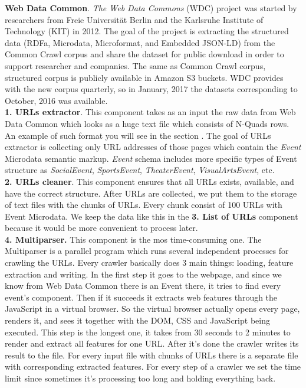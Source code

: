 \textbf{Web Data Common}. \textit{The Web Data Commons} (WDC) project was started by researchers from Freie Universität Berlin and the Karlsruhe Institute of Technology (KIT) in 2012. The goal of the project is extracting the structured data (RDFa, Microdata, Microformat, and Embedded JSON-LD) from the Common Crawl corpus and share the dataset for public download in order to support researcher and companies. The same as Common Crawl corpus, structured corpus is publicly available in Amazon S3 buckets. WDC provides with the new corpus quarterly, so in January, 2017 the datasets corresponding to October, 2016 was available.\\

\textbf{1. URLs extractor}. This component takes as an input the raw data from Web Data Common which looks as a huge text file which consists of N-Quads rows. An example of such format you will see in the section . The goal of URLs extractor is collecting only URL addresses of those pages which contain the \textit{Event} Microdata semantic markup. \textit{Event} schema includes more specific types of Event structure as \textit{SocialEvent}, \textit{SportsEvent}, \textit{TheaterEvent}, \textit{VisualArtsEvent}, etc.\\

\textbf{2. URLs cleaner}. This component ensures that all URLs exists, available, and have the correct structure. After URLs are collected, we put them to the storage of text files with the chunks of URLs. Every chunk consist of 100 URLs with Event Microdata. We keep the data like this in the \textbf{3. List of URLs} component because it would be more convenient to process later.\\

\textbf{4. Multiparser.} This component is the mos time-consuming one. The Multiparser is a parallel program which runs several independent processes for crawling the URLs. Every crawler basically does 3 main things: loading, feature extraction and writing. In the first step it goes to the webpage, and since we know from Web Data Common there is an Event there, it tries to find every event's component. Then if it succeeds it extracts web features through the JavaScript in a virtual browser. So the virtual browser actually opens every page, renders it, and sees it together with the DOM, CSS and JavaScript being executed. This step is the longest one, it takes from 30 seconds to 2 minutes to render and extract all features for one URL. After it's done the crawler writes its result to the file. For every input file with chunks of URLs there is a separate file with corresponding extracted features. For every step of a crawler we set the time limit since sometimes it's processing too long and holding everything back. \\

